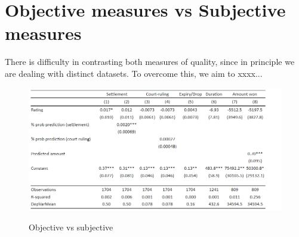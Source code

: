 \documentclass[oneside,11pt]{article}
\begin{document}
\section{Objective measures vs Subjective measures}


There is difficulty in contrasting both measures of quality, since in principle we are dealing with distinct datasets. To overcome this, we aim to xxxx...

\begin{figure}[H]%
 \centering
 \caption{Objective vs subjective}
 \includegraphics[width=\textwidth]{Figuras/obj_vs_sub.png}
 \label{fig:3}
\end{figure}










\clearpage

\onehalfspacing






\clearpage








\clearpage
\end{document}

